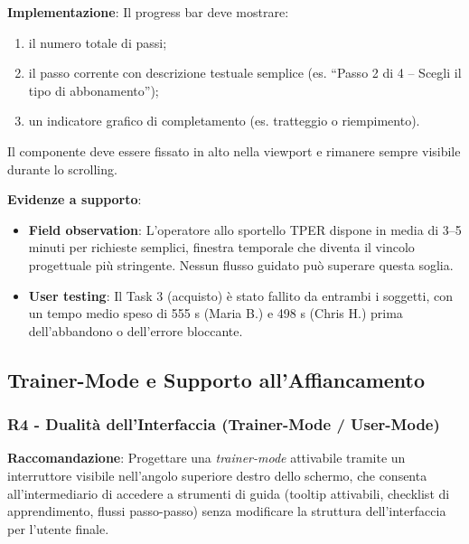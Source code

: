 \documentclass[11pt,a4paper]{article}
\begin{document}
\textbf{Implementazione}: Il progress bar deve mostrare:
\begin{enumerate}
    \item il numero totale di passi;
    \item il passo corrente con descrizione testuale semplice (es.
    “Passo 2 di 4 -- Scegli il tipo di abbonamento”);
    \item un indicatore grafico di completamento (es. tratteggio o
    riempimento).
\end{enumerate}
Il componente deve essere fissato in alto nella viewport e rimanere sempre
visibile durante lo scrolling.

\textbf{Evidenze a supporto}:
\begin{itemize}
    \item \textbf{Field observation}: L'operatore allo sportello TPER dispone in media
    di 3--5 minuti per richieste semplici, finestra temporale che
    diventa il vincolo progettuale pi\`u stringente. Nessun flusso guidato pu\`o
    superare questa soglia.
    \item \textbf{User testing}: Il Task 3 (acquisto) \`e stato fallito da
    entrambi i soggetti, con un tempo medio speso di 555 s (Maria B.) e 498 s
    (Chris H.) prima dell'abbandono
    o dell'errore bloccante.
\end{itemize}



\subsection{Trainer-Mode e Supporto all'Affiancamento}

\subsubsection{R4 - Dualit\`a dell'Interfaccia (Trainer-Mode / User-Mode)}
\label{rec:R4}

\textbf{Raccomandazione}: Progettare una \textit{trainer-mode} attivabile
tramite un interruttore visibile nell'angolo superiore destro dello schermo,
che consenta all'intermediario di accedere a strumenti di guida (tooltip
attivabili, checklist di apprendimento, flussi passo-passo) senza modificare
la struttura dell'interfaccia per l'utente finale.
\end{document}

